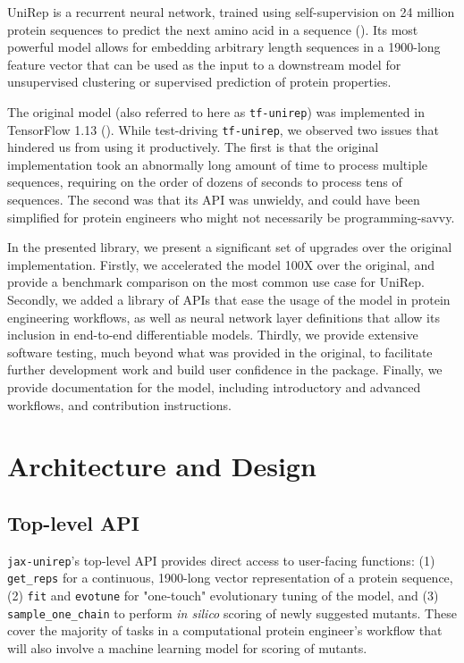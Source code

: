 \documentclass[twoside,11pt]{article}
\begin{document}
UniRep is a recurrent neural network,
trained using self-supervision
on 24 million protein sequences
to predict the next amino acid in a sequence (\cite{alley2019unified}).
Its most powerful model allows for embedding
arbitrary length sequences in a 1900-long feature vector
that can be used as the input to a downstream model
for unsupervised clustering or supervised prediction of protein properties.

The original model (also referred to here as \verb|tf-unirep|)
was implemented in TensorFlow 1.13 (\cite{abadi2016tensorflow}).
While test-driving \verb|tf-unirep|, we observed two issues
that hindered us from using it productively.
The first is that the original implementation
took an abnormally long amount of time to process multiple sequences,
requiring on the order of dozens of seconds to process tens of sequences.
The second was that its API was unwieldy,
and could have been simplified for protein engineers
who might not necessarily be programming-savvy.

In the presented library, we present a significant set of upgrades
over the original implementation.
Firstly, we accelerated the model 100X over the original,
and provide a benchmark comparison on the most common use case for UniRep.
Secondly, we added a library of APIs
that ease the usage of the model in protein engineering workflows,
as well as neural network layer definitions
that allow its inclusion in end-to-end differentiable models.
Thirdly, we provide extensive software testing,
much beyond what was provided in the original,
to facilitate further development work
and build user confidence in the package.
Finally, we provide documentation for the model,
including introductory and advanced workflows,
and contribution instructions.

\section{Architecture and Design}

\subsection{Top-level API}

\verb|jax-unirep|'s top-level API provides direct access
to user-facing functions:
(1) \verb|get_reps| for a continuous, 1900-long vector representation of a protein sequence,
(2) \verb|fit| and \verb|evotune| for "one-touch" evolutionary tuning of the model,
and
(3) \verb|sample_one_chain| to perform \textit{in silico} scoring of newly suggested mutants.
These cover the majority of tasks in a computational protein engineer's workflow
that will also involve a machine learning model for scoring of mutants.
\end{document}
